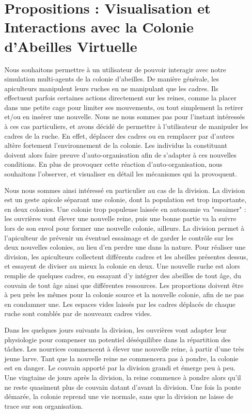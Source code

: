 \chapter{Propositions : Visualisation et Interactions avec la Colonie d'Abeilles Virtuelle}
\label{ChapitrePropVR}

		Nous souhaitons permettre à un utilisateur de pouvoir interagir avec notre simulation multi-agents de la colonie d'abeilles. De manière générale, les apiculteurs manipulent leurs ruches en ne manipulant que les cadres. Ils effectuent parfois certaines actions directement sur les reines, comme la placer dans une petite cage pour limiter ses mouvements, ou tout simplement la retirer et/ou en insérer une nouvelle. Nous ne nous sommes pas pour l'instant intéressés à ces cas particuliers, et avons décidé de permettre à l'utilisateur de manipuler les cadres de la ruche. En effet, déplacer des cadres ou en remplacer par d'autres altère fortement l'environnement de la colonie. Les individus la constituant doivent alors faire preuve d'auto-organisation afin de s'adapter à ces nouvelles conditions. En plus de provoquer cette réaction d'auto-organisation, nous souhaitons l'observer, et visualiser en détail les mécanismes qui la provoquent.
		
		Nous nous sommes ainsi intéressé en particulier au cas de la division. La division est un geste apicole séparant une colonie, dont la population est trop importante, en deux colonies. Une colonie trop populeuse laissée en autonomie va "essaimer" : les ouvrières vont élever une nouvelle reine, puis une bonne partie va la suivre lors de son envol pour former une nouvelle colonie, ailleurs. La division permet à l'apiculteur de prévenir un éventuel essaimage et de garder le contrôle sur les deux nouvelles colonies, au lieu d'en perdre une dans la nature. Pour réaliser une division, les apiculteurs collectent différents cadres et les abeilles présentes dessus, et essayent de diviser au mieux la colonie en deux. Une nouvelle ruche est alors remplie de quelques cadres, en essayant d'y intégrer des abeilles de tout âge, du couvain de tout âge ainsi que différentes ressources. Les proportions doivent être à peu près les mêmes pour la colonie source et la nouvelle colonie, afin de ne pas en condamner une. Les espaces vides laissés par les cadres déplacés de chaque ruche sont comblés par de nouveaux cadres vides.
		
		Dans les quelques jours suivants la division, les ouvrières vont adapter leur physiologie pour compenser un potentiel déséquilibre dans la répartition des tâches. Les nourrices commencent à élever une nouvelle reine, à partir d'une très jeune larve. Tant que la nouvelle reine ne commencera pas à pondre, la colonie est en danger. Le couvain apporté par la division grandi et émerge peu à peu. Une vingtaine de jours après la division, la reine commence à pondre alors qu'il ne reste quasiment plus de couvain datant d'avant la division. Une fois la ponte démarée, la colonie reprend une vie normale, sans que la division ne laisse de trace sur son organisation.
		
